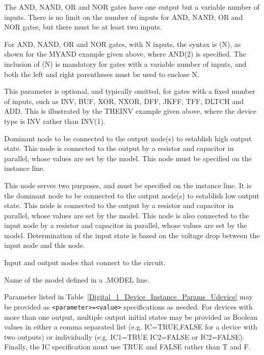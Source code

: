 \begin{Device}
\begin{Parameters}
The AND, NAND, OR and NOR gates have one output but a variable number of inputs.  
There is no limit on the number of inputs for AND, NAND, OR and NOR gates, but
there must be at least two inputs.


For AND, NAND, OR and NOR gates, with N inputs, the syntax is (N), as shown for the
MYAND example given above, where AND(2) is specified.  The inclusion of (N) is mandatory
for gates with a variable number of inputs, and both the left and right parentheses must
be used to enclose N.  

This parameter is optional, and typically omitted, for gates with a fixed number of
inputs, such as INV, BUF, XOR, NXOR, DFF, JKFF, TFF, DLTCH and ADD.  This is illustrated by the THEINV
example given above, where the device type is INV rather than INV(1).


Dominant node to be connected to the output node(s) to establish high
output state.  This node is connected to the output by a resistor and
capacitor in parallel, whose values are set by the model.  This node must
be specified on the instance line.


This node serves two purposes, and must be specified on the instance line.
It is the dominant node to be connected to the output node(s) to establish
low output state.  This node is connected to the output by a resistor and 
capacitor in parallel, whose values are set by the model.  This node is also
connected to the input node by a resistor and capacitor in parallel, whose
values are set by the model.  Determination of the input state is based on the
voltage drop between the input node and this node.


Input and output nodes that connect to the circuit.


 Name of the model defined in a .MODEL line.


Parameter listed in Table~\ref{Digital_1_Device_Instance_Params_Udevice} may be
provided as \texttt{<parameter>=<value>} specifications as needed.  For
devices with more than one output, multiple output initial states may be
provided as Boolean values in either a comma separated list (e.g.
IC=TRUE,FALSE for a device with two outputs) or individually 
(e.g. IC1=TRUE IC2=FALSE or IC2=FALSE).  Finally, the IC specification
must use TRUE and FALSE rather than T and F.

\end{Parameters}
\end{Device}

